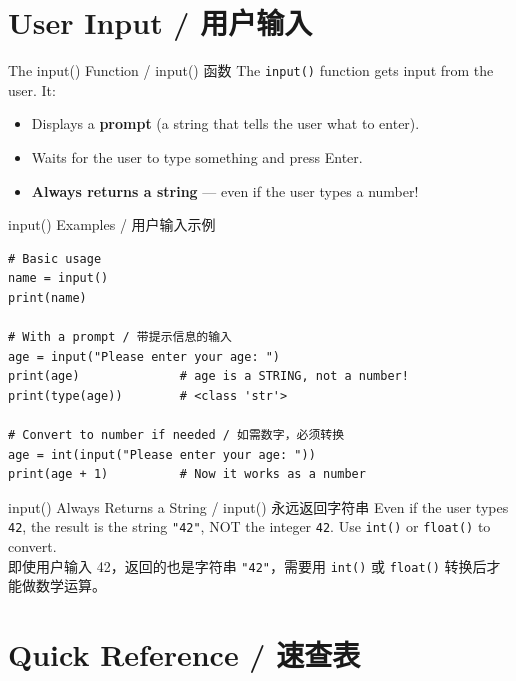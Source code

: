 \documentclass[11pt,a4paper]{report}
\let\oldtexttt\texttt
\renewcommand{\texttt}[1]{\textcolor{mainblue}{\oldtexttt{#1}}}
\begin{document}
\section{User Input / 用户输入}

\begin{concept}{The input() Function / input() 函数}
    The \texttt{input()} function gets input from the user. It:
    \begin{itemize}[itemsep=0.3em]
        \item Displays a \textbf{prompt} (a string that tells the user what to enter).
        \item Waits for the user to type something and press Enter.
        \item \textbf{Always returns a string} — even if the user types a number!
    \end{itemize}
\end{concept}

\begin{examplebox}{input() Examples / 用户输入示例}
\begin{lstlisting}
# Basic usage
name = input()
print(name)

# With a prompt / 带提示信息的输入
age = input("Please enter your age: ")
print(age)              # age is a STRING, not a number!
print(type(age))        # <class 'str'>

# Convert to number if needed / 如需数字，必须转换
age = int(input("Please enter your age: "))
print(age + 1)          # Now it works as a number
\end{lstlisting}
\end{examplebox}

\begin{warning}{input() Always Returns a String / input() 永远返回字符串}
    Even if the user types \texttt{42}, the result is the string \texttt{"42"}, NOT the integer \texttt{42}. Use \texttt{int()} or \texttt{float()} to convert. \\
    即使用户输入 42，返回的也是字符串 \texttt{"42"}，需要用 \texttt{int()} 或 \texttt{float()} 转换后才能做数学运算。
\end{warning}

\section{Quick Reference / 速查表}
\end{document}
